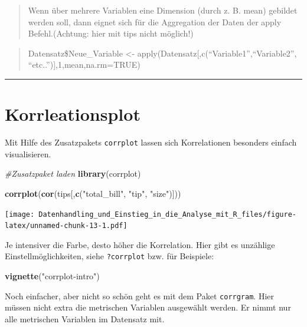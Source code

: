 \documentclass[10pt,ngerman,onside]{article}
\newenvironment{Shaded}{\begin{snugshade}}{\end{snugshade}}
\newcommand{\KeywordTok}[1]{\textcolor[rgb]{0.13,0.29,0.53}{\textbf{#1}}}
\newcommand{\StringTok}[1]{\textcolor[rgb]{0.31,0.60,0.02}{#1}}
\newcommand{\CommentTok}[1]{\textcolor[rgb]{0.56,0.35,0.01}{\textit{#1}}}
\newcommand{\NormalTok}[1]{#1}
\begin{document}
\begin{quote}
Wenn über mehrere Variablen eine Dimension (durch z. B. mean) gebildet
werden soll, dann eignet sich für die Aggregation der Daten der apply
Befehl.(Achtung: hier mit tips nicht möglich!)
\end{quote}

\begin{quote}
Datensatz\$Neue\_Variable \textless{}-
apply(Datensatz{[},c(``Variable1'',``Variable2'',
``etc..''){]},1,mean,na.rm=TRUE)
\end{quote}

\begin{center}\rule{0.5\linewidth}{\linethickness}\end{center}

\hypertarget{korrleationsplot}{%
\section{Korrleationsplot}\label{korrleationsplot}}

Mit Hilfe des Zusatzpakets \texttt{corrplot} lassen sich Korrelationen
besonders einfach visualisieren.

\begin{Shaded}
\begin{Highlighting}[]
\CommentTok{#Zusatzpaket laden}
\KeywordTok{library}\NormalTok{(corrplot)}

\KeywordTok{corrplot}\NormalTok{(}\KeywordTok{cor}\NormalTok{(tips[,}\KeywordTok{c}\NormalTok{(}\StringTok{"total_bill"}\NormalTok{, }\StringTok{"tip"}\NormalTok{, }\StringTok{"size"}\NormalTok{)]))}
\end{Highlighting}
\end{Shaded}

\texttt{[image: Datenhandling\_und\_Einstieg\_in\_die\_Analyse\_mit\_R\_files/figure-latex/unnamed-chunk-13-1.pdf]}

Je intensiver die Farbe, desto höher die Korrelation. Hier gibt es
unzählige Einstellmöglichkeiten, siehe \texttt{?corrplot} bzw. für
Beispiele:

\begin{Shaded}
\begin{Highlighting}[]
\KeywordTok{vignette}\NormalTok{(}\StringTok{"corrplot-intro"}\NormalTok{)}
\end{Highlighting}
\end{Shaded}

Noch einfacher, aber nicht so schön geht es mit dem Paket
\texttt{corrgram}. Hier müssen nicht extra die metrischen Variablen
ausgewählt werden. Er nimmt nur alle metrischen Variablen im Datensatz
mit.
\end{document}
